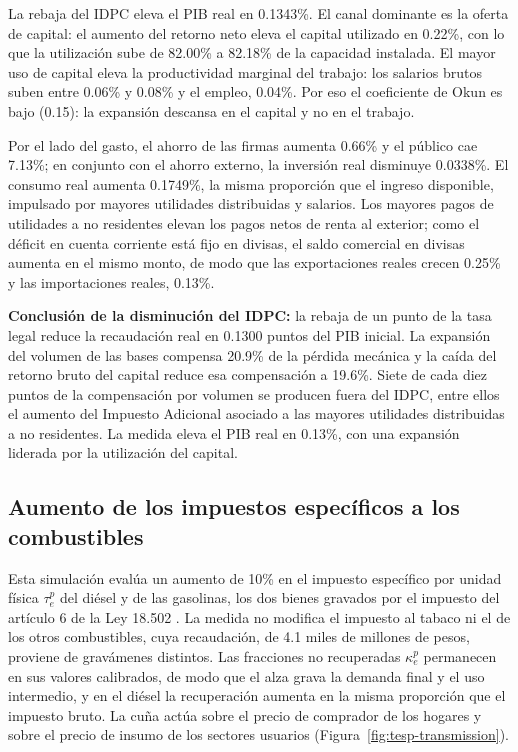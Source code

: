 \documentclass[11pt]{article}
\begin{document}
La rebaja del IDPC eleva el PIB real en 0.1343\%. El canal dominante es la oferta de capital: el aumento del retorno neto eleva el capital utilizado en 0.22\%, con lo que la utilización sube de 82.00\% a 82.18\% de la capacidad instalada. El mayor uso de capital eleva la productividad marginal del trabajo: los salarios brutos suben entre 0.06\% y 0.08\% y el empleo, 0.04\%. Por eso el coeficiente de Okun es bajo (0.15): la expansión descansa en el capital y no en el trabajo.

Por el lado del gasto, el ahorro de las firmas aumenta 0.66\% y el público cae 7.13\%; en conjunto con el ahorro externo, la inversión real disminuye 0.0338\%. El consumo real aumenta 0.1749\%, la misma proporción que el ingreso disponible, impulsado por mayores utilidades distribuidas y salarios. Los mayores pagos de utilidades a no residentes elevan los pagos netos de renta al exterior; como el déficit en cuenta corriente está fijo en divisas, el saldo comercial en divisas aumenta en el mismo monto, de modo que las exportaciones reales crecen 0.25\% y las importaciones reales, 0.13\%.

\textbf{Conclusión de la disminución del IDPC:} la rebaja de un punto de la tasa legal reduce la recaudación real en 0.1300 puntos del PIB inicial. La expansión del volumen de las bases compensa 20.9\% de la pérdida mecánica y la caída del retorno bruto del capital reduce esa compensación a 19.6\%. Siete de cada diez puntos de la compensación por volumen se producen fuera del IDPC, entre ellos el aumento del Impuesto Adicional asociado a las mayores utilidades distribuidas a no residentes. La medida eleva el PIB real en 0.13\%, con una expansión liderada por la utilización del capital.

\subsection{Aumento de los impuestos específicos a los combustibles}
\label{sec:sim-tesp}

Esta simulación evalúa un aumento de 10\% en el impuesto específico por unidad física $\tau_{e}^{p}$ del diésel y de las gasolinas, los dos bienes gravados por el impuesto del artículo 6 de la Ley 18.502 \cite{ley18502}. La medida no modifica el impuesto al tabaco ni el de los otros combustibles, cuya recaudación, de 4.1 miles de millones de pesos, proviene de gravámenes distintos. Las fracciones no recuperadas $\kappa_{e}^{p}$ permanecen en sus valores calibrados, de modo que el alza grava la demanda final y el uso intermedio, y en el diésel la recuperación aumenta en la misma proporción que el impuesto bruto. La cuña actúa sobre el precio de comprador de los hogares y sobre el precio de insumo de los sectores usuarios (Figura~\ref{fig:tesp-transmission}).
\end{document}
